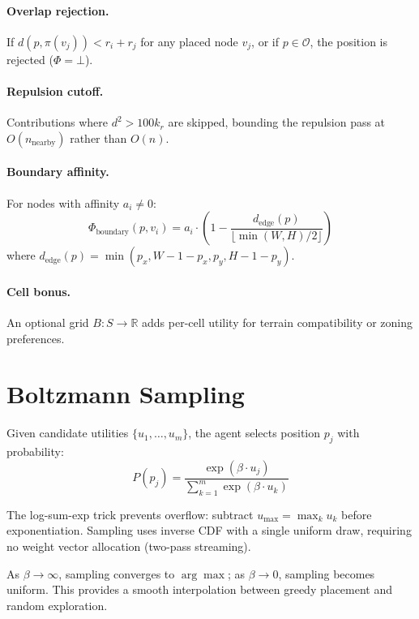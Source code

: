 \documentclass[11pt,a4paper]{article}
\begin{document}
\paragraph{Overlap rejection.} If $d(p, \pi(v_j)) < r_i + r_j$ for any placed
node $v_j$, or if $p \in \mathcal{O}$, the position is rejected ($\Phi =
\bot$).

\paragraph{Repulsion cutoff.} Contributions where $d^2 > 100 k_r$ are skipped,
bounding the repulsion pass at $O(n_\text{nearby})$ rather than $O(n)$.

\paragraph{Boundary affinity.} For nodes with affinity $a_i \neq 0$:
\begin{equation}
\Phi_\text{boundary}(p, v_i) = a_i \cdot \left(1 - \frac{d_\text{edge}(p)}{\lfloor \min(W,H)/2 \rfloor}\right)
\end{equation}
where $d_\text{edge}(p) = \min(p_x, W{-}1{-}p_x, p_y, H{-}1{-}p_y)$.

\paragraph{Cell bonus.} An optional grid $B: S \to \mathbb{R}$ adds per-cell
utility for terrain compatibility or zoning preferences.

\section{Boltzmann Sampling}

Given candidate utilities $\{u_1, \ldots, u_m\}$, the agent selects position
$p_j$ with probability:
\begin{equation}
P(p_j) = \frac{\exp(\beta \cdot u_j)}{\sum_{k=1}^{m} \exp(\beta \cdot u_k)}
\end{equation}

The log-sum-exp trick prevents overflow: subtract $u_{\max} = \max_k u_k$
before exponentiation. Sampling uses inverse CDF with a single uniform draw,
requiring no weight vector allocation (two-pass streaming).

As $\beta \to \infty$, sampling converges to $\arg\max$; as $\beta \to 0$,
sampling becomes uniform. This provides a smooth interpolation between greedy
placement and random exploration.
\end{document}
